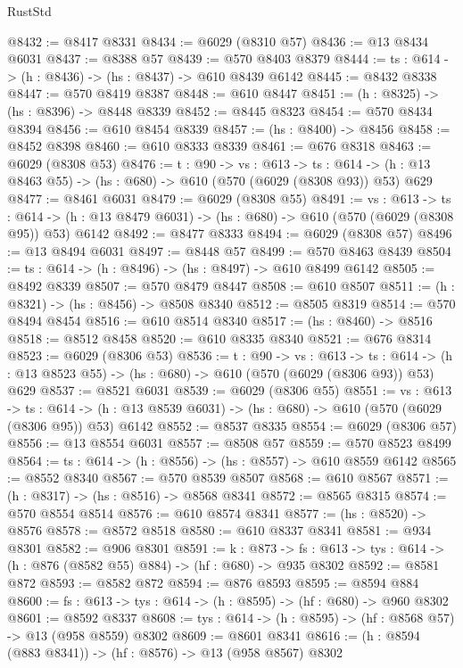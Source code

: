 \begin{lexlean}{RustStd}
\begin{coremodule}
@8432 := @8417 @8331
@8434 := @6029 (@8310 @57)
@8436 := @13 @8434 @6031
@8437 := @8388 @57
@8439 := @570 @8403 @8379
@8444 := {ts : @614} -> (h : @8436) -> (hs : @8437) -> @610 @8439 @6142
@8445 := @8432 @8338
@8447 := @570 @8419 @8387
@8448 := @610 @8447
@8451 := (h : @8325) -> (hs : @8396) -> @8448 @8339
@8452 := @8445 @8323
@8454 := @570 @8434 @8394
@8456 := @610 @8454 @8339
@8457 := (hs : @8400) -> @8456
@8458 := @8452 @8398
@8460 := @610 @8333 @8339
@8461 := @676 @8318
@8463 := @6029 (@8308 @53)
@8476 := {t : @90} ->
  {vs : @613} ->
  {ts : @614} -> (h : @13 @8463 @55) -> (hs : @680) -> @610 (@570 (@6029 (@8308 @93)) @53) @629
@8477 := @8461 @6031
@8479 := @6029 (@8308 @55)
@8491 := {vs : @613} ->
  {ts : @614} -> (h : @13 @8479 @6031) -> (hs : @680) -> @610 (@570 (@6029 (@8308 @95)) @53) @6142
@8492 := @8477 @8333
@8494 := @6029 (@8308 @57)
@8496 := @13 @8494 @6031
@8497 := @8448 @57
@8499 := @570 @8463 @8439
@8504 := {ts : @614} -> (h : @8496) -> (hs : @8497) -> @610 @8499 @6142
@8505 := @8492 @8339
@8507 := @570 @8479 @8447
@8508 := @610 @8507
@8511 := (h : @8321) -> (hs : @8456) -> @8508 @8340
@8512 := @8505 @8319
@8514 := @570 @8494 @8454
@8516 := @610 @8514 @8340
@8517 := (hs : @8460) -> @8516
@8518 := @8512 @8458
@8520 := @610 @8335 @8340
@8521 := @676 @8314
@8523 := @6029 (@8306 @53)
@8536 := {t : @90} ->
  {vs : @613} ->
  {ts : @614} -> (h : @13 @8523 @55) -> (hs : @680) -> @610 (@570 (@6029 (@8306 @93)) @53) @629
@8537 := @8521 @6031
@8539 := @6029 (@8306 @55)
@8551 := {vs : @613} ->
  {ts : @614} -> (h : @13 @8539 @6031) -> (hs : @680) -> @610 (@570 (@6029 (@8306 @95)) @53) @6142
@8552 := @8537 @8335
@8554 := @6029 (@8306 @57)
@8556 := @13 @8554 @6031
@8557 := @8508 @57
@8559 := @570 @8523 @8499
@8564 := {ts : @614} -> (h : @8556) -> (hs : @8557) -> @610 @8559 @6142
@8565 := @8552 @8340
@8567 := @570 @8539 @8507
@8568 := @610 @8567
@8571 := (h : @8317) -> (hs : @8516) -> @8568 @8341
@8572 := @8565 @8315
@8574 := @570 @8554 @8514
@8576 := @610 @8574 @8341
@8577 := (hs : @8520) -> @8576
@8578 := @8572 @8518
@8580 := @610 @8337 @8341
@8581 := @934 @8301
@8582 := @906 @8301
@8591 := {k : @873} ->
  {fs : @613} -> {tys : @614} -> (h : @876 (@8582 @55) @884) -> (hf : @680) -> @935 @8302
@8592 := @8581 @872
@8593 := @8582 @872
@8594 := @876 @8593
@8595 := @8594 @884
@8600 := {fs : @613} -> {tys : @614} -> (h : @8595) -> (hf : @680) -> @960 @8302
@8601 := @8592 @8337
@8608 := {tys : @614} -> (h : @8595) -> (hf : @8568 @57) -> @13 (@958 @8559) @8302
@8609 := @8601 @8341
@8616 := (h : @8594 (@883 @8341)) -> (hf : @8576) -> @13 (@958 @8567) @8302

\end{coremodule}
\end{lexlean}
